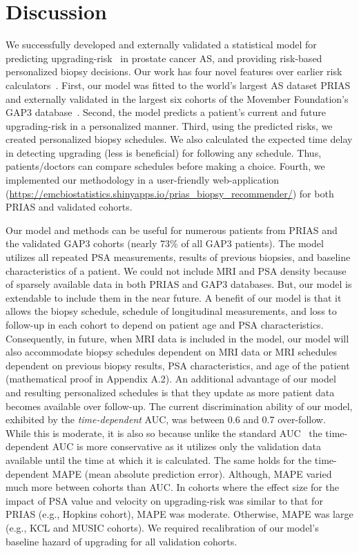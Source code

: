 \section{Discussion}
We successfully developed and externally validated a statistical model for predicting upgrading-risk~\citep{bruinsma2017expert} in prostate cancer AS, and providing risk-based personalized biopsy decisions. Our work has four novel features over earlier risk calculators~\citep{coley2017prediction,ankerst2015precision}. First, our model was fitted to the world's largest AS dataset PRIAS and externally validated in the largest six cohorts of the Movember Foundation's GAP3 database~\citep{gap3_2018}. Second, the model predicts a patient's current and future upgrading-risk in a personalized manner. Third, using the predicted risks, we created personalized biopsy schedules. We also calculated the expected time delay in detecting upgrading (less is beneficial) for following any schedule. Thus, patients/doctors can compare schedules before making a choice. Fourth, we implemented our methodology in a user-friendly web-application (\url{https://emcbiostatistics.shinyapps.io/prias_biopsy_recommender/}) for both PRIAS and validated cohorts.

Our model and methods can be useful for numerous patients from PRIAS and the validated GAP3 cohorts (nearly 73\% of all GAP3 patients). The model utilizes all repeated PSA measurements, results of previous biopsies, and baseline characteristics of a patient. We could not include MRI and PSA density because of sparsely available data in both PRIAS and GAP3 databases. But, our model is extendable to include them in the near future. A benefit of our model is that it allows the biopsy schedule, schedule of longitudinal measurements, and loss to follow-up in each cohort to depend on patient age and PSA characteristics. Consequently, in future, when MRI data is included in the model, our model will also accommodate biopsy schedules dependent on MRI data or MRI schedules dependent on previous biopsy results, PSA characteristics, and age of the patient (mathematical proof in Appendix A.2). An additional advantage of our model and resulting personalized schedules is that they update as more patient data becomes available over follow-up. The current discrimination ability of our model, exhibited by the \textit{time-dependent} AUC, was between 0.6 and 0.7 over-follow. While this is moderate, it is also so because unlike the standard AUC~\citep{steyerberg2010assessing} the time-dependent AUC is more conservative as it utilizes only the validation data available until the time at which it is calculated. The same holds for the time-dependent MAPE (mean absolute prediction error). Although, MAPE varied much more between cohorts than AUC. In cohorts where the effect size for the impact of PSA value and velocity on upgrading-risk was similar to that for PRIAS (e.g., Hopkins cohort), MAPE was moderate. Otherwise, MAPE was large (e.g., KCL and MUSIC cohorts). We required recalibration of our model's baseline hazard of upgrading for all validation cohorts.

